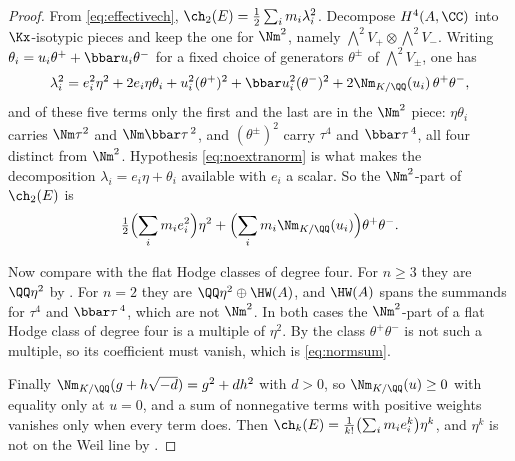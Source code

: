 \begin{proof}
From \eqref{eq:effectivech},
$\ch_{2}(E)=\tfrac12\sum_{i}m_{i}\lambda_{i}^{2}$. Decompose $H^{4}(A,\CC)$
into $\Kx$-isotypic pieces and keep the one for $\Nm^{2}$, namely
$\bigwedge^{2}V_{+}\otimes\bigwedge^{2}V_{-}$. Writing
$\theta_{i}=u_{i}\theta^{+}+\bbar u_{i}\theta^{-}$ for a fixed choice of
generators $\theta^{\pm}$ of $\bigwedge^{2}V_{\pm}$, one has
\[
  \lambda_{i}^{2}
  =e_{i}^{2}\eta^{2}
   +2e_{i}\eta\theta_{i}
   +u_{i}^{2}(\theta^{+})^{2}+\bbar u_{i}^{2}(\theta^{-})^{2}
   +2\Nm_{K/\QQ}(u_{i})\,\theta^{+}\theta^{-},
\]
and of these five terms only the first and the last are in the $\Nm^{2}$
piece: $\eta\theta_{i}$ carries $\Nm\tau^{2}$ and $\Nm\bbar\tau^{\,2}$, and
$(\theta^{\pm})^{2}$ carry $\tau^{4}$ and $\bbar\tau^{\,4}$, all four distinct
from $\Nm^{2}$. Hypothesis \eqref{eq:noextranorm} is what makes the
decomposition $\lambda_{i}=e_{i}\eta+\theta_{i}$ available with $e_{i}$ a
scalar. So the $\Nm^{2}$-part of $\ch_{2}(E)$ is
\[
  \tfrac12\Bigl(\sum_{i}m_{i}e_{i}^{2}\Bigr)\eta^{2}
  +\Bigl(\sum_{i}m_{i}\Nm_{K/\QQ}(u_{i})\Bigr)\theta^{+}\theta^{-}.
\]

Now compare with the flat Hodge classes of degree four. For $n\ge3$ they are
$\QQ\eta^{2}$ by . For $n=2$ they are
$\QQ\eta^{2}\oplus\HW(A)$, and $\HW(A)$ spans the summands for $\tau^{4}$ and
$\bbar\tau^{\,4}$, which are not $\Nm^{2}$. In both cases the $\Nm^{2}$-part
of a flat Hodge class of degree four is a multiple of $\eta^{2}$. By
 the class $\theta^{+}\theta^{-}$ is not such a multiple,
so its coefficient must vanish, which is \eqref{eq:normsum}.

Finally $\Nm_{K/\QQ}(g+h\sqrt{-d})=g^{2}+dh^{2}$ with $d>0$, so
$\Nm_{K/\QQ}(u)\ge0$ with equality only at $u=0$, and a sum of nonnegative
terms with positive weights vanishes only when every term does. Then
$\ch_{k}(E)=\frac{1}{k!}\bigl(\sum_{i}m_{i}e_{i}^{k}\bigr)\eta^{k}$, and
$\eta^{k}$ is not on the Weil line by .
\end{proof}

